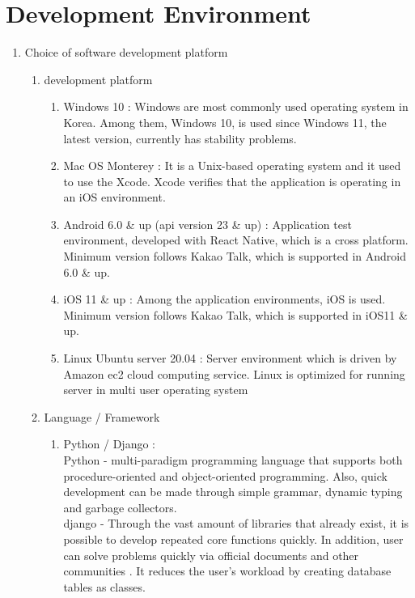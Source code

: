 \documentclass[11pt, conference]{IEEEtran}
\begin{document}
\section{\Large{Development Environment}}
\begin{enumerate}[label=\arabic*]
    \item {\large{Choice of software development platform}}
    \begin{enumerate}[label=\alph*]
        \item development platform
        \begin{enumerate}
            \item Windows 10 : Windows are most commonly used operating system in Korea.  Among them, Windows 10, is used since Windows 11, the latest version, currently has stability problems.
            \item Mac OS Monterey : It is a Unix-based operating system and it used to use the Xcode. Xcode verifies that the application is operating in an iOS environment. 
            \item Android 6.0 \& up (api version 23 \& up) : Application test environment, developed with React Native, which is a cross platform. Minimum version follows Kakao Talk, which is supported in Android 6.0 \& up.
            \item iOS 11 \& up : Among the application environments, iOS is used. Minimum version follows Kakao Talk, which is supported in iOS11 \& up.
            \item Linux Ubuntu server 20.04 : Server environment which is driven by Amazon ec2 cloud computing service. Linux is optimized for running server in multi user operating system
        \end{enumerate}
        \item Language / Framework
        \begin{enumerate}
            \item Python / Django : \\
            Python - multi-paradigm programming language that supports both procedure-oriented and object-oriented programming. Also, quick development can be made through simple grammar, dynamic typing and garbage collectors. \\
            django - Through the vast amount of libraries that already exist, it is possible to develop repeated core functions quickly. In addition, user can solve problems quickly via official documents and other communities . It reduces the user's workload by creating database tables as classes.

\end{enumerate}
\end{enumerate}
\end{enumerate}
\end{document}
